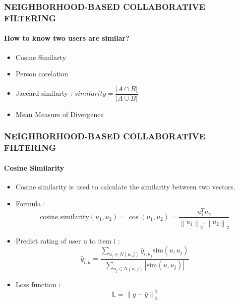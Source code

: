 \documentclass[11pt]{beamer}
\begin{document}
\begin{frame}
\frametitle{\textbf{NEIGHBORHOOD-BASED COLLABORATIVE FILTERING}}
\framesubtitle{How to know two users are similar?}
\begin{itemize}
	\pause\item Cosine Similarty
	\pause\item Person corelation
	\pause\item Jaccard similarty : $ similarity = \dfrac{|A\cap B|}{|A\cup B|}$
	\pause\item Mean Measure of Divergence
\end{itemize}
\end{frame}


\begin{frame}
\frametitle{\textbf{NEIGHBORHOOD-BASED COLLABORATIVE FILTERING}}
\framesubtitle{Cosine Similarity}
\begin{itemize}
	\pause\item Cosine similarity is used to calculate the similarity between two vectors.
	\pause\item Formula : 
$$ \mbox{cosine\_similarity}(u_1, u_2) = \cos(u_1,u_2) = \dfrac{u_1^Tu_2}{\left\|u_1\right\|_2.\left\|u_2\right\|_2}  $$
	\pause\item Predict rating of user u to item i : \\
	$$ \hat{y}_{i,u} = \dfrac{\sum_{u_j\in N(u,j)} \bar{y}_{i,u_j}\mbox{sim}(u, u_j)}{\sum_{u_j\in N(u,j)}|\mbox{sim}(u, u_j)|} $$
	\pause\item Loss function :
	$$\mathbb{L} = \left\| y - \hat{y} \right\|^2_2 $$

\end{itemize} 

\end{frame}

\end{document}

